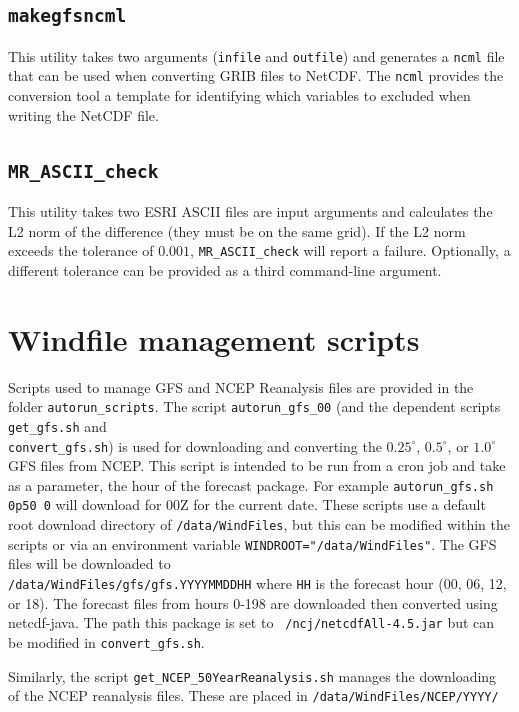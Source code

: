 \documentclass[11pt]{article}   %
\begin{document}
\subsection{\texttt{makegfsncml}}
This utility takes two arguments (\texttt{infile} and \texttt{outfile})
and generates a \texttt{ncml} file that can be used when converting
GRIB files to NetCDF.  The \texttt{ncml} provides the conversion tool a template
for identifying which variables to excluded when writing the NetCDF file.

\subsection{\texttt{MR\_ASCII\_check}}
This utility takes two ESRI ASCII files are input arguments and calculates the L2 norm of
the difference (they must be on the same grid).  If the L2 norm exceeds the tolerance of
$0.001$, \texttt{MR\_ASCII\_check} will report a failure.  Optionally, a different tolerance
can be provided as a third command-line argument.

\section{Windfile management scripts}
Scripts used to manage GFS and NCEP Reanalysis files are provided in the
folder \texttt{autorun\_scripts}.
The script \texttt{autorun\_gfs\_00} (and the dependent scripts
\texttt{get\_gfs.sh} and\\
\texttt{convert\_gfs.sh}) is used for downloading and
converting the $0.25^{\circ}$, $0.5^{\circ}$, or $1.0^{\circ}$ GFS files from NCEP.  This script is intended to be
run from a cron job and take as a parameter, the hour of the forecast package.  For example
\texttt{autorun\_gfs.sh 0p50 0} will download for 00Z for the current date.  These 
scripts use a default root download directory of \texttt{/data/WindFiles}, but this can
be modified within the scripts or via an environment variable \texttt{WINDROOT="/data/WindFiles"}.
The GFS files will be downloaded to\\
\texttt{/data/WindFiles/gfs/gfs.YYYYMMDDHH} where \texttt{HH} is the forecast hour
(00, 06, 12, or 18).  The forecast files from hours 0-198 are downloaded then converted using
netcdf-java.  The path this package is set to \texttt{~/ncj/netcdfAll-4.5.jar} but can be
modified in \texttt{convert\_gfs.sh}.

Similarly, the script \texttt{get\_NCEP\_50YearReanalysis.sh} manages the downloading of 
the NCEP reanalysis files.  These are placed in \texttt{/data/WindFiles/NCEP/YYYY/}
\end{document}
